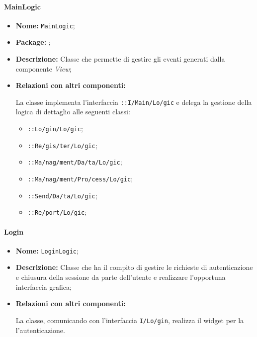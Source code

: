 \paragraph{MainLogic}
\begin{flushleft}
\begin{itemize}
\item \textbf{Nome:} \texttt{MainLogic};
\item \textbf{Package:} \texttt{\logicUser{}};
\item \textbf{Descrizione:} Classe che permette di gestire gli eventi generati dalla componente \textit{View};
\item \textbf{Relazioni con altri componenti:}
\begin{sloppypar}
La classe implementa l'interfaccia \texttt{\iLogicUser{}::I\fshyp{}Main\fshyp{}Lo\fshyp{}gic} e delega la gestione della logica di dettaglio alle seguenti classi:
\end{sloppypar}
\begin{itemize}
\item \texttt{\logicUser{}::Lo\fshyp{}gin\fshyp{}Lo\fshyp{}gic};
\item \texttt{\logicUser{}::Re\fshyp{}gis\fshyp{}ter\fshyp{}Lo\fshyp{}gic};
\item \texttt{\logicUser{}::Ma\fshyp{}nag\fshyp{}ment\fshyp{}Da\fshyp{}ta\fshyp{}Lo\fshyp{}gic};
\item \texttt{\logicUser{}::Ma\fshyp{}nag\fshyp{}ment\fshyp{}Pro\fshyp{}cess\fshyp{}Lo\fshyp{}gic};
\item \texttt{\logicUser{}::Send\fshyp{}Da\fshyp{}ta\fshyp{}Lo\fshyp{}gic};
\item \texttt{\logicUser{}::Re\fshyp{}port\fshyp{}Lo\fshyp{}gic};
\end{itemize}
\end{itemize}
\end{flushleft}

\paragraph{Login}
\begin{flushleft}
\begin{itemize}
\item \textbf{Nome:} \texttt{LoginLogic};
\item \textbf{Descrizione:} Classe che ha il compito di gestire le richieste di autenticazione e chiusura della sessione da parte dell'utente e realizzare l'opportuna interfaccia grafica;
\item \textbf{Relazioni con altri componenti:}
\begin{sloppypar}
La classe, comunicando con l'interfaccia \texttt{I\fshyp{}Lo\fshyp{}gin}, realizza il widget per la l'autenticazione.
\end{sloppypar}
\end{itemize}
\end{flushleft}

